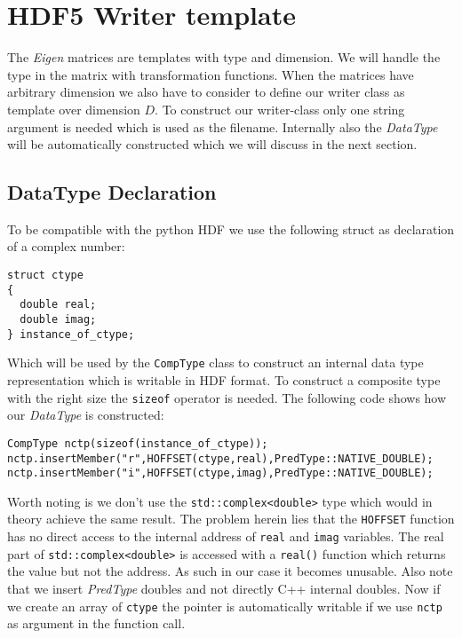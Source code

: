 \documentclass{article}
\begin{document}
\section{HDF5 Writer template}
The \textit{Eigen} matrices are templates with type and dimension. We will handle the type in the matrix with transformation functions. When the matrices have arbitrary dimension we also have to consider to define our writer class as template over dimension $D$. To construct our writer-class only one string argument is needed which is used as the filename. Internally also the \textit{DataType} will be automatically constructed which we will discuss in the next section.
\subsection{DataType Declaration}
To be compatible with the python HDF we use the following struct as declaration of a complex number:
\begin{lstlisting}
struct ctype
{
  double real;
  double imag;
} instance_of_ctype;
\end{lstlisting}
Which will be used by the \texttt{CompType} class to construct an internal data type representation which is writable in HDF format. To construct a composite type with the right size the \texttt{sizeof} operator is needed. The following code shows how our \textit{DataType} is constructed:
\begin{lstlisting}
CompType nctp(sizeof(instance_of_ctype));
nctp.insertMember("r",HOFFSET(ctype,real),PredType::NATIVE_DOUBLE);
nctp.insertMember("i",HOFFSET(ctype,imag),PredType::NATIVE_DOUBLE);
\end{lstlisting}
Worth noting is we don't use the \texttt{std::complex<double>} type which would in theory achieve the same result. The problem herein lies that the \texttt{HOFFSET} function has no direct access to the internal address of \texttt{real} and \texttt{imag} variables. The real part of \texttt{std::complex<double>} is accessed with a \texttt{real()} function which returns the value but not the address. As such in our case it becomes unusable. Also note that we insert \textit{PredType} doubles and not directly C++ internal doubles. Now if we create an array of \texttt{ctype} the pointer is automatically writable if we use \texttt{nctp} as argument in the function call.
\end{document}
